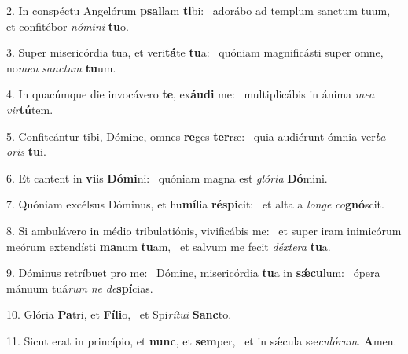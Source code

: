 2. In conspéctu Angelórum \textbf{psal}lam \textbf{ti}bi: \ast\  adorábo ad templum sanctum tuum, et confitébor \textit{nó}\textit{mi}\textit{ni} \textbf{tu}o.\

3. Super misericórdia tua, et veri\textbf{tá}te \textbf{tu}a: \ast\  quóniam magnificásti super omne, no\textit{men} \textit{sanc}\textit{tum} \textbf{tu}um.\

4. In quacúmque die invocávero \textbf{te}, ex\textbf{áu}\textbf{di} me: \ast\  multiplicábis in ánima \textit{me}\textit{a} \textit{vir}\textbf{tú}tem.\

5. Confiteántur tibi, Dómine, omnes \textbf{re}ges \textbf{ter}ræ: \ast\  quia audiérunt ómnia ver\textit{ba} \textit{o}\textit{ris} \textbf{tu}i.\

6. Et cantent in \textbf{vi}is \textbf{Dó}\textbf{mi}ni: \ast\  quóniam magna est \textit{gló}\textit{ri}\textit{a} \textbf{Dó}mini.\

7. Quóniam excélsus Dóminus, et hu\textbf{mí}lia \textbf{ré}\textbf{spi}cit: \ast\  et alta a \textit{lon}\textit{ge} \textit{co}\textbf{gnó}scit.\

8. Si ambulávero in médio tribulatiónis, vivificábis me: \dag\  et super iram inimicórum meórum extendísti \textbf{ma}num \textbf{tu}am, \ast\  et salvum me fecit \textit{déx}\textit{te}\textit{ra} \textbf{tu}a.\

9. Dóminus retríbuet pro me: \dag\  Dómine, misericórdia \textbf{tu}a in \textbf{sǽ}\textbf{cu}lum: \ast\  ópera mánuum tuá\textit{rum} \textit{ne} \textit{de}\textbf{spí}cias.\

10. Glória \textbf{Pa}tri, et \textbf{Fí}\textbf{li}o, \ast\  et Spi\textit{rí}\textit{tu}\textit{i} \textbf{Sanc}to.\

11. Sicut erat in princípio, et \textbf{nunc}, et \textbf{sem}per, \ast\  et in sǽcula sæ\textit{cu}\textit{ló}\textit{rum}. \textbf{A}men.\

